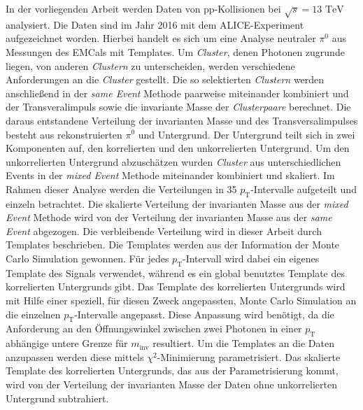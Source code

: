 In der vorliegenden Arbeit werden Daten von pp-Kollisionen bei $\sqrt{s}=13\text{ TeV}$ analysiert.
Die Daten sind im Jahr 2016 mit dem ALICE-Experiment aufgezeichnet worden.
Hierbei handelt es sich um eine Analyse neutraler $\pi^{0}$ aus Messungen des EMCals mit Templates. %
\newline
Um \textit{Cluster}, denen Photonen zugrunde liegen, von anderen \textit{Clustern} zu unterscheiden, werden verschiedene Anforderungen an die \textit{Cluster} gestellt.
Die so selektierten \textit{Clustern} werden anschließend in der \textit{same Event} Methode paarweise miteinander kombiniert und der Transveralimpuls sowie die invariante Masse der \textit{Clusterpaare} berechnet.
\newline
Die daraus entstandene Verteilung der invarianten Masse und des Transversalimpulses besteht aus rekonstruierten $\pi^{0}$ und Untergrund.
Der Untergrund teilt sich in zwei Komponenten auf, den kor\-re\-lier\-ten und den unkorrelierten Untergrund.
Um den unkorrelierten Untergrund abzuschätzen wurden \textit{Cluster} aus unterschiedlichen Events in der \textit{mixed Event} Methode miteinander kombiniert und skaliert.
\newline
Im Rahmen dieser Analyse werden die Verteilungen in 35 $p_\text{T}$-Intervalle aufgeteilt und einzeln betrachtet.
Die skalierte Verteilung der invarianten Masse aus der \textit{mixed Event} Methode wird von der Verteilung der invarianten Masse aus der \textit{same Event} abgezogen.
\newline
Die verbleibende Verteilung wird in dieser Arbeit durch Templates beschrieben.
Die Templates werden aus der Information der Monte Carlo Simulation gewonnen.
Für jedes $p_\text{T}$-Intervall wird dabei ein eigenes Template des Signals verwendet, während es ein global benutztes Template des korrelierten Untergrunds gibt.
Das Template des korrelierten Untergrunds wird mit Hilfe einer speziell, für diesen Zweck angepassten, Monte Carlo Simulation an die einzelnen $p_\text{T}$-Intervalle angepasst.
Diese Anpassung wird benötigt, da die Anforderung an den Öffnungswinkel zwischen zwei Photonen in einer $p_\text{T}$ abhängige untere Grenze für $m_\text{inv}$ resultiert.
\newline
Um die Templates an die Daten anzupassen werden diese mittels $\chi^{2}$-Minimierung parametrisiert.
Das skalierte Template des korrelierten Untergrunds, das aus der Parametrisierung kommt, wird von der Verteilung der invarianten Masse der Daten ohne unkorrelierten Untergrund subtrahiert.
